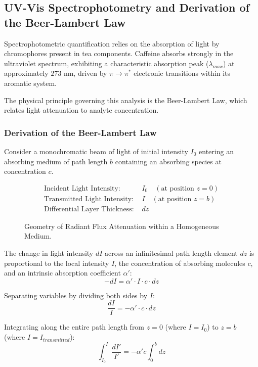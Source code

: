 \documentclass[11pt,a4paper]{article}
\begin{document}
\subsection{UV-Vis Spectrophotometry and Derivation of the Beer-Lambert Law}
Spectrophotometric quantification relies on the absorption of light by chromophores present in tea components. Caffeine absorbs strongly in the ultraviolet spectrum, exhibiting a characteristic absorption peak ($\lambda_{max}$) at approximately $273 \text{ nm}$, driven by $\pi \to \pi^*$ electronic transitions within its aromatic system.

The physical principle governing this analysis is the Beer-Lambert Law, which relates light attenuation to analyte concentration.

\subsubsection{Derivation of the Beer-Lambert Law}
Consider a monochromatic beam of light of initial intensity $I_0$ entering an absorbing medium of path length $b$ containing an absorbing species at concentration $c$. 

\begin{figure}[h!]
\centering
\begin{align*}
\text{Incident Light Intensity: } &I_0 \quad (\text{at position } z = 0) \\
\text{Transmitted Light Intensity: } &I \quad (\text{at position } z = b) \\
\text{Differential Layer Thickness: } &dz
\end{align*}
\caption{Geometry of Radiant Flux Attenuation within a Homogeneous Medium.}
\end{figure}

The change in light intensity $dI$ across an infinitesimal path length element $dz$ is proportional to the local intensity $I$, the concentration of absorbing molecules $c$, and an intrinsic absorption coefficient $\alpha'$:
\begin{equation}
-dI = \alpha' \cdot I \cdot c \cdot dz
\end{equation}

Separating variables by dividing both sides by $I$:
\begin{equation}
\frac{dI}{I} = -\alpha' \cdot c \cdot dz
\end{equation}

Integrating along the entire path length from $z = 0$ (where $I = I_0$) to $z = b$ (where $I = I_{transmitted}$):
\begin{equation}
\int_{I_0}^{I} \frac{dI'}{I'} = -\alpha' c \int_{0}^{b} dz
\end{equation}
\end{document}
